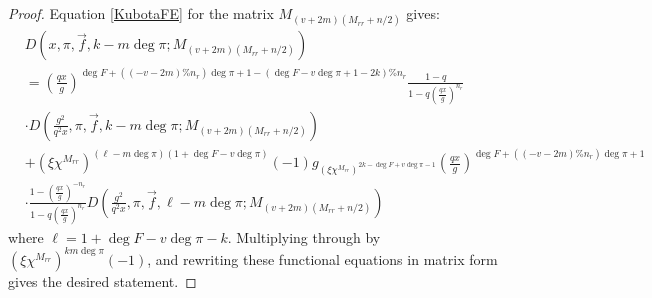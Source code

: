 \documentclass[11pt,letterpaper]{article}
\theoremstyle{definition}
\theoremstyle{remark}
\numberwithin{equation}{section}
\theoremstyle{dotless}
\begin{document}
\begin{proof}
Equation \ref{KubotaFE} for the matrix $M_{(v+2m)(M_{rr}+n/2)}$ gives:
\begin{equation*}
\begin{split}
&D(x, \pi, \vec{f}, k-m\deg \pi; M_{(v+2m)(M_{rr}+n/2)}) \\
& = \left(\frac{qx}{g}\right)^{\deg F + ((-v-2m)\%n_r)\deg \pi + 1 - (\deg F -v\deg \pi +1-2k)\% n_r} \frac{1-q}{1-q\left(\frac{q x}{g}\right)^{n_r}} \\
& \cdot D\left(\frac{g^2}{q^2x}, \pi, \vec{f}, k-m\deg \pi; M_{(v+2m)(M_{rr}+n/2)}\right) \\
&+(\xi \chi^{M_{rr}})^{(\ell- m\deg \pi)(1+\deg F-v\deg \pi)}(-1) g_{(\xi \chi^{M_{rr}})^{2k-\deg F +v\deg \pi-1}} \left(\frac{qx}{g}\right)^{\deg F+ ((-v-2m)\%n_r)\deg \pi + 1} \\
&\cdot \frac{1-\left(\frac{qx}{g}\right)^{-n_r}}{1-q\left(\frac{qx}{g}\right)^{n_r}} D\left(\frac{g^2}{q^2x}, \pi, \vec{f}, \ell - m \deg \pi; M_{(v+2m)(M_{rr}+n/2)} \right)
\end{split}
\end{equation*}
where $\ell=1+\deg F -v\deg \pi -k$. Multiplying through by $(\xi \chi^{M_{rr}})^{km\deg \pi}(-1)$, and rewriting these functional equations in matrix form gives the desired statement.
\end{proof}
\end{document}

